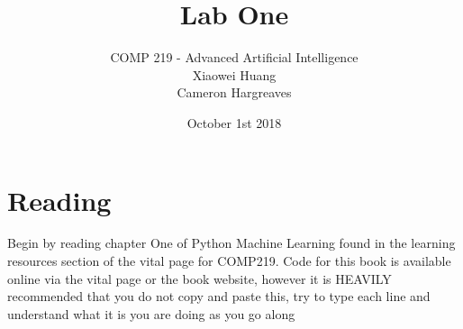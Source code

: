 \documentclass[12pt]{article}
\begin{document}


\date{October 1st 2018}
 
 
\title{Lab One}%
\author{COMP 219 - Advanced Artificial Intelligence \\
		Xiaowei Huang \\ 
		Cameron Hargreaves\\}
 
\maketitle

\section{Reading}
Begin by reading chapter One of Python Machine Learning found in the learning resources section of the vital page for COMP219. Code for this book is available online via the vital page or the book website, however it is HEAVILY recommended that you do not copy and paste this, try to type each line and understand what it is you are doing as you go along
\end{document}

